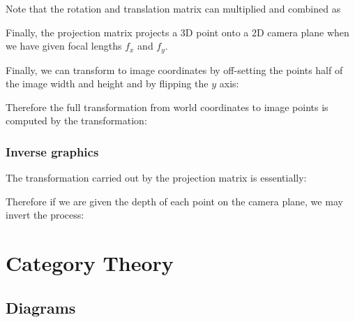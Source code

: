 \documentclass[12pt]{article}
\begin{document}

Note that the rotation and translation matrix can multiplied and combined as

Finally, the projection matrix projects a 3D point onto a 2D camera plane when we have given focal lengths $f_x$ and $f_y$.


Finally, we can transform to image coordinates by off-setting the points half of the image width and height and by flipping the $y$ axis:


Therefore the full transformation from world coordinates to image points is computed by the transformation:


\subsubsection{Inverse graphics}

The transformation carried out by the projection matrix is essentially:


Therefore if we are given the depth of each point on the camera plane, we may invert the process:


\section{Category Theory}

\subsection{Diagrams}
\end{document}
